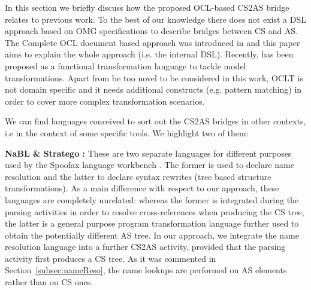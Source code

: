\documentclass{llncs}
\begin{document}
In this section we briefly discuss how the proposed OCL-based CS2AS bridge relates to previous work. To the best of our knowledge there does not exist a DSL approach based on OMG specifications to describe bridges between CS and AS. The Complete OCL document based approach was introduced in \cite{sanchez2014enhancingXtext} and this paper aims to explain the whole approach (i.e. the internal DSL). Recently,  \cite{jouault2015oclt} has been proposed as a functional transformation language to tackle model transformations. Apart from be too novel to be considered in this work, OCLT is not domain specific and it needs additional constructs (e.g. pattern matching) in order to cover more complex transformation scenarios.

We can find languages conceived to sort out the CS2AS bridges in other contexts, i.e in the context of some specific tools. %
We highlight two of them:

\textbf{NaBL \cite{konat2013decNameRes} \& Stratego \cite{visser2004stratego}:} These are two separate languages for different purposes used by the Spoofax language workbench \cite{spoofaxOnline}. The former is used to declare name resolution and the latter to declare syntax rewrites (tree based structure transformations). As a main difference with respect to our approach, these languages are completely unrelated: whereas the former is integrated during the parsing activities in order to resolve cross-references when producing the CS tree, the latter is a general purpose program transformation language further used to obtain the potentially different AS tree. In our approach, we integrate the name resolution language into a further CS2AS activity, provided that the parsing activity first produces a CS tree. As it was commented in Section~\ref{subsec:nameReso}, the name lookups are performed on AS elements rather than on CS ones.
\end{document}
